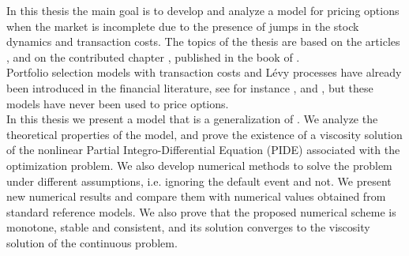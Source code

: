 In this thesis the main goal is to develop and analyze a model for pricing options when the market is incomplete due to the presence of jumps in the stock dynamics 
and transaction costs. 
The topics of the thesis are based on the articles 
\cite{Canta2}, \cite{Canta}
and on the contributed chapter \cite{Canta3}, published in the book of \cite{Matthias}.\\
Portfolio selection models with transaction costs and Lévy processes have already been introduced in the financial literature, 
see for instance \cite{OkSu01}, \cite{BKR01} and \cite{Kab16}, 
but these models have never been used to price options.\\  
In this thesis we present a model that is a generalization of \cite{DaPaZa93}. 
We analyze the theoretical properties of the model, and prove the existence of a viscosity solution 
of the nonlinear Partial Integro-Differential Equation (PIDE) associated with the optimization problem. 
We also develop numerical methods to solve the problem under different assumptions, i.e. ignoring the 
default event and not.
We present new numerical results and compare them with numerical values obtained from standard reference models. We also prove that 
the proposed numerical scheme is monotone, stable and consistent, and its solution converges to the viscosity solution of the continuous problem.

